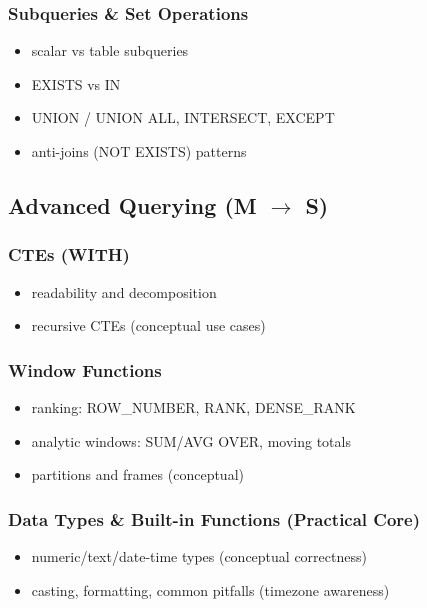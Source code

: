 \subsubsection{Subqueries \& Set Operations}
\begin{itemize}
    \item scalar vs table subqueries
    \item EXISTS vs IN
    \item UNION / UNION ALL, INTERSECT, EXCEPT
    \item anti-joins (NOT EXISTS) patterns
\end{itemize}

\subsection{Advanced Querying (M $\rightarrow$ S)}

\subsubsection{CTEs (WITH)}
\begin{itemize}
    \item readability and decomposition
    \item recursive CTEs (conceptual use cases)
\end{itemize}

\subsubsection{Window Functions}
\begin{itemize}
    \item ranking: ROW\_NUMBER, RANK, DENSE\_RANK
    \item analytic windows: SUM/AVG OVER, moving totals
    \item partitions and frames (conceptual)
\end{itemize}

\subsubsection{Data Types \& Built-in Functions (Practical Core)}
\begin{itemize}
    \item numeric/text/date-time types (conceptual correctness)
    \item casting, formatting, common pitfalls (timezone awareness)
\end{itemize}

